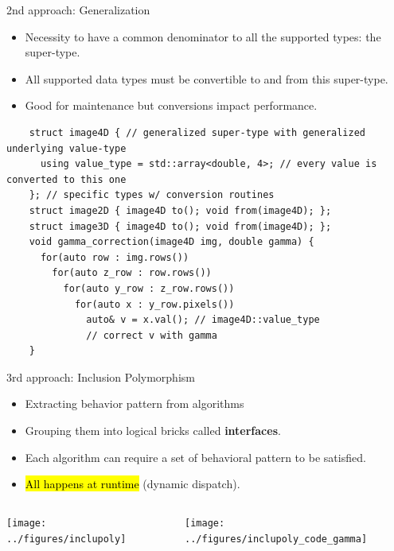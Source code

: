 \documentclass[12pt,aspectratio=169]{beamer}
\makeatletter
\let\HL\hl
\renewcommand\hl{%
  \let\set@color\beamerorig@set@color
  \let\reset@color\beamerorig@reset@color
  \HL}
\makeatother
\begin{document}
\begin{frame}[fragile]{2nd approach: Generalization}
  \begin{itemize}
    \item Necessity to have a common denominator to all the supported types: the super-type.
    \item All supported data types must be convertible to and from this super-type.
    \item Good for maintenance but conversions impact performance.
  \end{itemize}
  \begin{verbatim}
    struct image4D { // generalized super-type with generalized underlying value-type
      using value_type = std::array<double, 4>; // every value is converted to this one
    }; // specific types w/ conversion routines
    struct image2D { image4D to(); void from(image4D); };
    struct image3D { image4D to(); void from(image4D); };
    void gamma_correction(image4D img, double gamma) {
      for(auto row : img.rows())
        for(auto z_row : row.rows())
          for(auto y_row : z_row.rows())
            for(auto x : y_row.pixels())
              auto& v = x.val(); // image4D::value_type
              // correct v with gamma
    }
  \end{verbatim}
\end{frame}

\begin{frame}[fragile]{3rd approach: Inclusion Polymorphism}
  \begin{itemize}
    \item Extracting behavior pattern from algorithms
    \item Grouping them into logical bricks called \textbf{interfaces}.
    \item Each algorithm can require a set of behavioral pattern to be satisfied.
    \item \hl{All happens at runtime} (dynamic dispatch).
  \end{itemize}

  \begin{columns}[T,onlytextwidth]
    \centering
    \texttt{[image: ../figures/inclupoly]}

    \centering
    \texttt{[image: ../figures/inclupoly\_code\_gamma]}
  \end{columns}
\end{frame}
\end{document}
